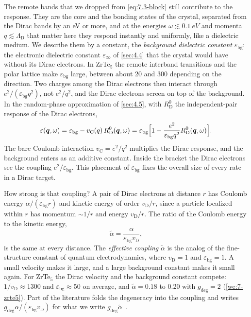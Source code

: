 The remote bands that we dropped from \cref{eq:7.3-block} still contribute to the response. They are the core and the bonding states of the crystal, separated from the Dirac bands by an eV or more, and at the energies $\omega \lesssim \SI{0.1}{eV}$ and momenta $q \lesssim \Lambda_{\mathrm{D}}$ that matter here they respond instantly and uniformly, like a dielectric medium. We describe them by a constant, the \emph{background dielectric constant} $\varepsilon_{\mathrm{bg}}$: the electronic dielectric constant $\varepsilon_\infty$ of \cref{sec:4.4} that the crystal would have without its Dirac electrons. In ZrTe$_5$ the remote interband transitions and the polar lattice make $\varepsilon_{\mathrm{bg}}$ large, between about 20 and 300 depending on the direction. Two charges among the Dirac electrons then interact through $e^2/(\varepsilon_{\mathrm{bg}}q^2)$, not $e^2/q^2$, and the Dirac electrons screen on top of the background. In the random-phase approximation of \cref{sec:4.5}, with $R^0_{\mathrm{D}}$ the independent-pair response of the Dirac electrons,
\begin{equation}
  \varepsilon(\bm{q},\omega) = \varepsilon_{\mathrm{bg}} - v_{\mathrm{C}}(q)\,R^0_{\mathrm{D}}(\bm{q},\omega) = \varepsilon_{\mathrm{bg}}\Bigl[1 - \frac{e^2}{\varepsilon_{\mathrm{bg}}q^2}R^0_{\mathrm{D}}(\bm{q},\omega)\Bigr] .
  \label{eq:7.3-epsbg}
\end{equation}
The bare Coulomb interaction $v_{\mathrm{C}} = e^2/q^2$ multiplies the Dirac response, and the background enters as an additive constant. Inside the bracket the Dirac electrons see the coupling $e^2/\varepsilon_{\mathrm{bg}}$. This placement of $\varepsilon_{\mathrm{bg}}$ fixes the overall size of every rate in a Dirac target.

How strong is that coupling? A pair of Dirac electrons at distance $r$ has Coulomb energy $\alpha/(\varepsilon_{\mathrm{bg}}r)$ and kinetic energy of order $v_{\mathrm{D}}/r$, since a particle localized within $r$ has momentum $\sim 1/r$ and energy $v_{\mathrm{D}}/r$. The ratio of the Coulomb energy to the kinetic energy,
\begin{equation}
  \tilde\alpha = \frac{\alpha}{\varepsilon_{\mathrm{bg}}v_{\mathrm{D}}} ,
  \label{eq:7.3-alpha}
\end{equation}
is the same at every distance. The \emph{effective coupling} $\tilde\alpha$ is the analog of the fine-structure constant of quantum electrodynamics, where $v_{\mathrm{D}} = 1$ and $\varepsilon_{\mathrm{bg}} = 1$. A small velocity makes it large, and a large background constant makes it small again. For ZrTe$_5$ the Dirac velocity and the background constant compete: $1/v_{\mathrm{D}} \approx 1300$ and $\varepsilon_{\mathrm{bg}} \approx 50$ on average, and $\tilde\alpha = 0.18$ to 0.20 with $g_{\mathrm{deg}} = 2$ (\cref{we:7-zrte5}). Part of the literature folds the degeneracy into the coupling and writes $g_{\mathrm{deg}}\alpha/(\varepsilon_{\mathrm{bg}}v_{\mathrm{D}})$ for what we write $g_{\mathrm{deg}}\tilde\alpha$~\cite[Eq.~(2.5)]{hochberg2018detection}.

